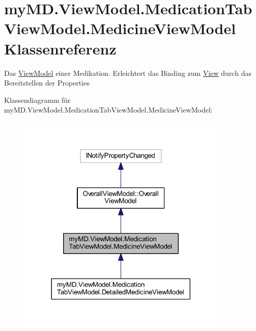 \hypertarget{classmy_m_d_1_1_view_model_1_1_medication_tab_view_model_1_1_medicine_view_model}{}\section{my\+M\+D.\+View\+Model.\+Medication\+Tab\+View\+Model.\+Medicine\+View\+Model Klassenreferenz}
\label{classmy_m_d_1_1_view_model_1_1_medication_tab_view_model_1_1_medicine_view_model}


Das \mbox{\hyperlink{namespacemy_m_d_1_1_view_model}{View\+Model}} einer Medikation. Erleichtert das Binding zum \mbox{\hyperlink{namespacemy_m_d_1_1_view}{View}} durch das Bereitstellen der Properties  




Klassendiagramm für my\+M\+D.\+View\+Model.\+Medication\+Tab\+View\+Model.\+Medicine\+View\+Model\+:\nopagebreak
\begin{figure}[H]
\begin{center}
\leavevmode
\includegraphics[width=284pt]{classmy_m_d_1_1_view_model_1_1_medication_tab_view_model_1_1_medicine_view_model__inherit__graph}
\end{center}
\end{figure}


